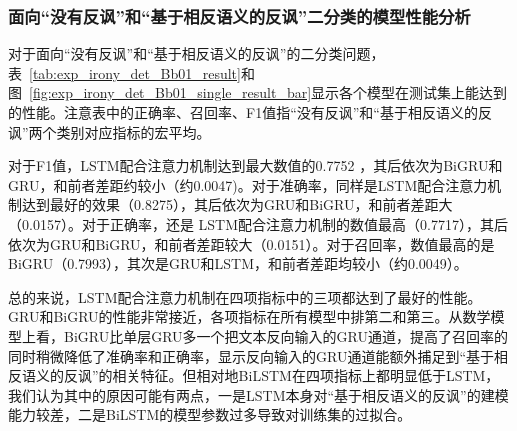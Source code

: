 \subsubsection{面向“没有反讽”和“基于相反语义的反讽”二分类的模型性能分析}
\label{sssec:exp_irony_det_Bb01_base}

对于面向“没有反讽”和“基于相反语义的反讽”的二分类问题，表~\ref{tab:exp_irony_det_Bb01_result}和图~\ref{fig:exp_irony_det_Bb01_single_result_bar}显示各个模型在测试集上能达到的性能。注意表中的正确率、召回率、F1值指“没有反讽”和“基于相反语义的反讽”两个类别对应指标的宏平均。

对于F1值，LSTM配合注意力机制达到最大数值的0.7752 ，其后依次为BiGRU和GRU，和前者差距约较小（约0.0047)。对于准确率，同样是LSTM配合注意力机制达到最好的效果（0.8275），其后依次为GRU和BiGRU，和前者差距大（0.0157）。对于正确率，还是 LSTM配合注意力机制的数值最高（0.7717），其后依次为GRU和BiGRU，和前者差距较大（0.0151）。对于召回率，数值最高的是BiGRU（0.7993），其次是GRU和LSTM，和前者差距均较小（约0.0049）。

总的来说，LSTM配合注意力机制在四项指标中的三项都达到了最好的性能。GRU和BiGRU的性能非常接近，各项指标在所有模型中排第二和第三。从数学模型上看，BiGRU比单层GRU多一个把文本反向输入的GRU通道，提高了召回率的同时稍微降低了准确率和正确率，显示反向输入的GRU通道能额外捕足到“基于相反语义的反讽”的相关特征。但相对地BiLSTM在四项指标上都明显低于LSTM，我们认为其中的原因可能有两点，一是LSTM本身对“基于相反语义的反讽”的建模能力较差，二是BiLSTM的模型参数过多导致对训练集的过拟合。

